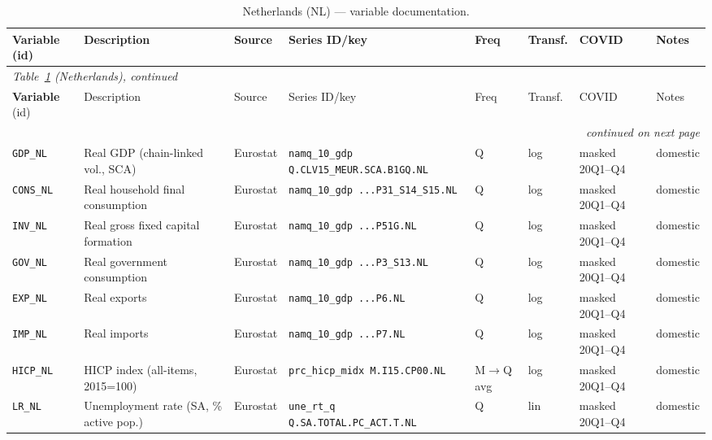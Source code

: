 \begin{longtable}{@{}p{}p{}p{}p{}p{}p{}p{}p{}@{}}
\caption{Netherlands (NL) --- variable documentation.}\label{tab:data:NL}\\
\toprule
\textbf{Variable} (id) & Description & Source & Series ID/key & Freq & Transf. & COVID & Notes \\
\midrule
\endfirsthead
\multicolumn{8}{l}{\small\itshape Table~\ref{tab:data:NL} (Netherlands), continued}\\
\toprule
\textbf{Variable} (id) & Description & Source & Series ID/key & Freq & Transf. & COVID & Notes \\
\midrule
\endhead
\midrule \multicolumn{8}{r}{\small\itshape continued on next page}\\
\endfoot
\bottomrule
\endlastfoot
\texttt{GDP\_NL}    & Real GDP (chain-linked vol., SCA) & Eurostat & \texttt{namq\_10\_gdp Q.\allowbreak CLV15\_MEUR.\allowbreak SCA.\allowbreak B1GQ.\allowbreak NL} & Q & log & masked 20Q1--Q4 & domestic \\
\texttt{CONS\_NL}   & Real household final consumption & Eurostat & \texttt{namq\_10\_gdp ...\allowbreak P31\_S14\_S15.\allowbreak NL} & Q & log & masked 20Q1--Q4 & domestic \\
\texttt{INV\_NL}    & Real gross fixed capital formation & Eurostat & \texttt{namq\_10\_gdp ...\allowbreak P51G.\allowbreak NL} & Q & log & masked 20Q1--Q4 & domestic \\
\texttt{GOV\_NL}    & Real government consumption & Eurostat & \texttt{namq\_10\_gdp ...\allowbreak P3\_S13.\allowbreak NL} & Q & log & masked 20Q1--Q4 & domestic \\
\texttt{EXP\_NL}    & Real exports & Eurostat & \texttt{namq\_10\_gdp ...\allowbreak P6.\allowbreak NL} & Q & log & masked 20Q1--Q4 & domestic \\
\texttt{IMP\_NL}    & Real imports & Eurostat & \texttt{namq\_10\_gdp ...\allowbreak P7.\allowbreak NL} & Q & log & masked 20Q1--Q4 & domestic \\
\texttt{HICP\_NL}   & HICP index (all-items, 2015=100) & Eurostat & \texttt{prc\_hicp\_midx M.\allowbreak I15.\allowbreak CP00.\allowbreak NL} & M$\to$Q avg & log & masked 20Q1--Q4 & domestic \\
\texttt{LR\_NL}     & Unemployment rate (SA, \% active pop.) & Eurostat & \texttt{une\_rt\_q Q.\allowbreak SA.\allowbreak TOTAL.\allowbreak PC\_ACT.\allowbreak T.\allowbreak NL} & Q & lin & masked 20Q1--Q4 & domestic \\

\end{longtable}

